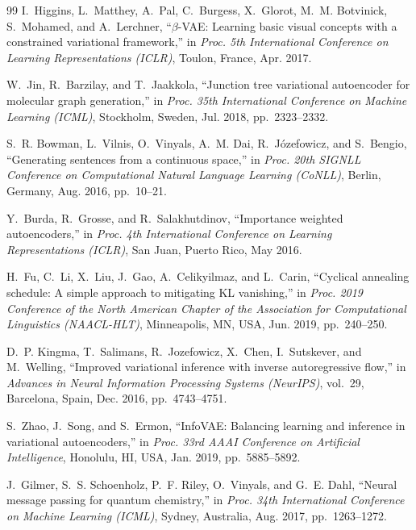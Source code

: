 \documentclass[12pt,a4paper]{report}
\begin{document}
\begin{thebibliography}{99}
I.~Higgins, L.~Matthey, A.~Pal, C.~Burgess, X.~Glorot, M.~M. Botvinick, S.~Mohamed, and A.~Lerchner,
``$\beta$-VAE: Learning basic visual concepts with a constrained variational framework,''
in \textit{Proc. 5th International Conference on Learning Representations (ICLR)},
Toulon, France, Apr. 2017.

W.~Jin, R.~Barzilay, and T.~Jaakkola,
``Junction tree variational autoencoder for molecular graph generation,''
in \textit{Proc. 35th International Conference on Machine Learning (ICML)},
Stockholm, Sweden, Jul. 2018, pp.~2323--2332.


S.~R. Bowman, L.~Vilnis, O.~Vinyals, A.~M. Dai, R.~J\'{o}zefowicz, and S.~Bengio,
``Generating sentences from a continuous space,''
in \textit{Proc. 20th SIGNLL Conference on Computational Natural Language Learning (CoNLL)},
Berlin, Germany, Aug. 2016, pp.~10--21.

Y.~Burda, R.~Grosse, and R.~Salakhutdinov,
``Importance weighted autoencoders,''
in \textit{Proc. 4th International Conference on Learning Representations (ICLR)},
San Juan, Puerto Rico, May 2016.

H.~Fu, C.~Li, X.~Liu, J.~Gao, A.~Celikyilmaz, and L.~Carin,
``Cyclical annealing schedule: A simple approach to mitigating KL vanishing,''
in \textit{Proc. 2019 Conference of the North American Chapter of the Association for Computational Linguistics (NAACL-HLT)},
Minneapolis, MN, USA, Jun. 2019, pp.~240--250.

D.~P. Kingma, T.~Salimans, R.~Jozefowicz, X.~Chen, I.~Sutskever, and M.~Welling,
``Improved variational inference with inverse autoregressive flow,''
in \textit{Advances in Neural Information Processing Systems (NeurIPS)},
vol.~29, Barcelona, Spain, Dec. 2016, pp.~4743--4751.

S.~Zhao, J.~Song, and S.~Ermon,
``InfoVAE: Balancing learning and inference in variational autoencoders,''
in \textit{Proc. 33rd AAAI Conference on Artificial Intelligence},
Honolulu, HI, USA, Jan. 2019, pp.~5885--5892.


J.~Gilmer, S.~S. Schoenholz, P.~F. Riley, O.~Vinyals, and G.~E. Dahl,
``Neural message passing for quantum chemistry,''
in \textit{Proc. 34th International Conference on Machine Learning (ICML)},
Sydney, Australia, Aug. 2017, pp.~1263--1272.


\end{thebibliography}
\end{document}

